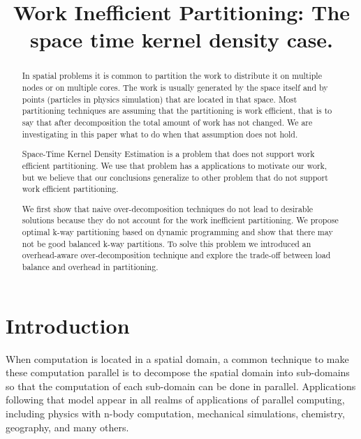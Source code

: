 \documentclass[10pt, conference, compsocconf]{IEEEtran}
\begin{document}
\title{Work Inefficient Partitioning: The space time kernel density case.}


\author{
}

\maketitle


\begin{abstract}
  In spatial problems it is common to partition the work to distribute
  it on multiple nodes or on multiple cores. The work is usually
  generated by the space itself and by points (particles in physics
  simulation) that are located in that space. Most partitioning
  techniques are assuming that the partitioning is work efficient,
  that is to say that after decomposition the total amount of work has
  not changed. We are investigating in this paper what to do when that
  assumption does not hold.

  Space-Time Kernel Density Estimation is a problem that does not
  support work efficient partitioning. We use that problem has a
  applications to motivate our work, but we believe that our
  conclusions generalize to other problem that do not support work
  efficient partitioning.

  We first show that naive over-decomposition techniques do not lead
  to desirable solutions because they do not account for the work
  inefficient partitioning. We propose optimal k-way partitioning
  based on dynamic programming and show that there may not be good
  balanced k-way partitions. To solve this problem we introduced an
  overhead-aware over-decomposition technique and explore the
  trade-off between load balance and overhead in partitioning.
\end{abstract}

\begin{IEEEkeywords}
\end{IEEEkeywords}


\IEEEpeerreviewmaketitle

\section{Introduction}

When computation is located in a spatial domain, a common technique to
make these computation parallel is to decompose the spatial domain
into sub-domains so that the computation of each sub-domain can be done
in parallel. Applications following that model appear in all realms of
applications of parallel computing, including physics with n-body
computation, mechanical simulations, chemistry, geography, and many others.
\end{document}
